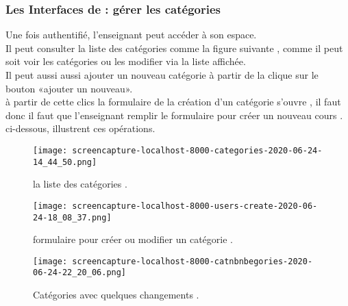 \subsubsection{Les Interfaces de : gérer les catégories  }
Une fois authentifié,  l'enseignant peut accéder à son espace. \\ 
Il peut consulter la liste  des catégories comme la figure suivante
, comme il peut soit voir les catégories ou les modifier
via la liste affichée.  \\
Il peut aussi aussi ajouter un nouveau catégorie à partir de  la clique sur le bouton «ajouter un nouveau».  \\
à partir de cette clics la formulaire de la création d'un catégorie s'ouvre , il faut donc il faut que l'enseignant remplir le formulaire  pour créer un nouveau cours . \\
ci-dessous, illustrent ces opérations.
\medskip
\medskip
\medskip
\begin{figure}[ht]
	\centering
	\texttt{[image: screencapture-localhost-8000-categories-2020-06-24-14\_44\_50.png]}
	\caption{la liste des catégories .}
	\label{fig:la liste des catégories }
\end{figure}
\FloatBarrier


\begin{figure}[ht]
	\centering
	\texttt{[image: screencapture-localhost-8000-users-create-2020-06-24-18\_08\_37.png]}
	\caption{formulaire pour créer ou modifier un catégorie .}
	\label{fig: formulaire pour créer ou modifier un catégorie }
\end{figure}
\FloatBarrier

\begin{figure}[ht]
	\centering
	\texttt{[image: screencapture-localhost-8000-catnbnbegories-2020-06-24-22\_20\_06.png]}
	\caption{Catégories avec quelques changements .}
	\label{fig: Catégories avec quelques changements  }
\end{figure}
\FloatBarrier



